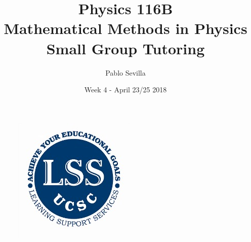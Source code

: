 \documentclass{article}
\title{Physics 116B \\ Mathematical Methods in Physics\\ Small Group Tutoring}
\author{Pablo Sevilla}
\date{Week 4 - April 23/25 2018}
\begin{document}
\maketitle

\begin{figure}[h]
\centering
\includegraphics[scale=0.3]{lss}
\end{figure}
\end{document}
